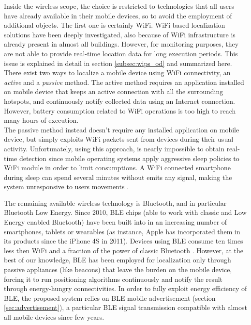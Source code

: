 \smallskip
Inside the wireless scope, the choice is restricted to technologies that all users have already available in their mobile devices, so to avoid the employment of additional objects. The first one is certainly WiFi. WiFi based localization solutions have been deeply investigated, also because of WiFi infrastructure is already present in almost all buildings. However, for monitoring purposes, they are not able to provide real-time location data for long execution periods. This issue is explained in detail in section \ref{subsec:wips_od} and summarized here.\\
There exist two ways to localize a mobile device using WiFi connectivity, an \emph{active} and a \emph{passive} method. The active method requires an application installed on mobile device that keeps an active connection with all the surrounding hotspots, and continuously notify collected data using an Internet connection. However, battery consumption related to WiFi operations is too high to reach many hours of execution.\\
The passive method instead doesn't require any installed application on mobile device, but simply exploits WiFi packets sent from devices during their usual activity. Unfortunately, using this approach, is nearly impossible to obtain real-time detection since mobile operating systems apply aggressive sleep policies to WiFi module in order to limit consumptions. A WiFi connected smartphone during sleep can spend several minutes without emits any signal, making the system unresponsive to users movements \cite{Balaji2013}.

\smallskip
The remaining available wireless technology is Bluetooth, and in particular Bluetooth Low Energy. Since 2010, BLE chips (able to work with classic and Low Energy enabled Bluetooth) have been built into in an increasing number of smartphones, tablets or wearables (as instance, Apple has incorporated them in its products since the iPhone 4S in 2011).
Devices using BLE consume ten times less then WiFi and a fraction of the power of classic Bluetooth \cite{Choperena2013}.
However, at the best of our knowledge, BLE has been employed for localization only through passive appliances (like beacons) that leave the burden on the mobile device, forcing it to run positioning algorithms continuously and notify the result through energy-hungry connectivities.
In order to fully exploit energy efficiency of BLE, the proposed system relies on BLE mobile advertisement (section \ref{sec:advertisement}), a particular BLE signal transmission compatible with almost all mobile devices since few years.


